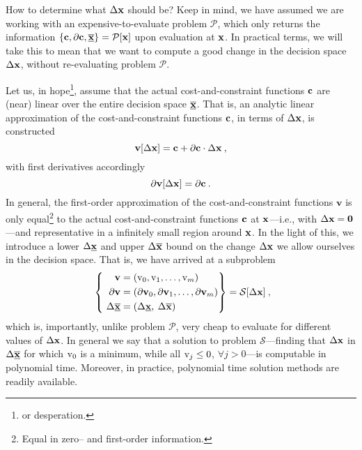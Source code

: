 \documentclass[11pt]{article}
\begin{document}
How to determine what $\Delta \mathbf{x}$ should be? Keep in mind, we have assumed we are working with an expensive-to-evaluate problem $\mathcal{P}$, which only returns the information $\left\{\mathbf{c}, \partial \mathbf{c}, \underline{\overline{\mathbf{x}}}\right\}=\mathcal{P}[\mathbf{x}]$ upon evaluation at $\mathbf{x}$. In practical terms, we will take this to mean that we want to compute a good change in the decision space $\Delta \mathbf{x}$, without re-evaluating problem $\mathcal{P}$.

Let us, in hope\footnote{or desperation.}, assume that the actual cost-and-constraint functions $\mathbf{c}$ are (near) linear over the entire decision space $\underline{\overline{\mathbf{x}}}$. That is, an analytic linear approximation of the cost-and-constraint functions $\mathbf{c}$, in terms of $\Delta \mathbf{x}$, is constructed
\begin{equation}
\textbf{v}[\Delta \mathbf{x}] = \mathbf{c} + \partial \mathbf{c} \cdot \Delta \mathbf{x} \:,
\end{equation}
with first derivatives accordingly
\begin{equation}
\partial \textbf{v}[\Delta \mathbf{x}] = \partial \mathbf{c} \:.
\end{equation}
In general, the first-order approximation of the cost-and-constraint functions $\textbf{v}$ is only equal\footnote{Equal in zero-- and first-order information.} to the actual cost-and-constraint functions $\mathbf{c}$ at $\mathbf{x}$---i.e., with $\Delta \mathbf{x}=\textbf{0}$---and representative in a infinitely small region around $\mathbf{x}$. In the light of this, we introduce a lower $\Delta \underline{\mathbf{x}}$ and upper $\Delta \overline{\mathbf{x}}$ bound on the change $\Delta \mathbf{x}$ we allow ourselves in the decision space.
That is, we have arrived at a subproblem 
\begin{align}
\label{d:eqn:p}
 ~\left\{ ~
\begin{aligned}
\mathbf{v} &= (\textrm{v}_0, \textrm{v}_1, \ldots, \textrm{v}_m ) \\
\mathbf{\partial v} & = (\mathbf{\partial v}_0 , \mathbf{\partial v}_1 , \ldots,\mathbf{\partial v}_m  ) \\
\Delta \underline{\overline{\mathbf{x}}} & = ( \Delta \underline{\mathbf{x}} , \: \Delta \overline{\mathbf{x}} ) \:
\end{aligned}\right\} =
\mathcal{S} [\Delta \mathbf{x}] \: ,
\end{align}
which is, importantly, unlike problem $\mathcal{P}$, very cheap to evaluate for different values of $\Delta \mathbf{x}$. In general we say that a solution to problem $\mathcal{S}$---finding that $\Delta \mathbf{x}$ in $\Delta \overline{\underline{\mathbf{x}}}$ for which $\textrm{v}_0$ is a minimum, while all $\textrm{v}_j \leq 0$, $\forall j > 0$---is computable in polynomial time. Moreover, in practice, polynomial time solution methods are readily available.
\end{document}
